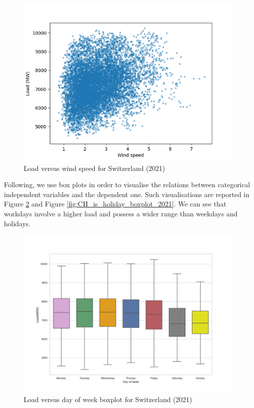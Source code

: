 \begin{figure}[!h]
    \includegraphics[width=\textwidth]{images/CH_load_vs_wind_speed_2021.png}
    \caption{Load versus wind speed for Switzerland (2021)}
    \label{fig:CH_load_vs_wind_speed_2021}
\end{figure}

Following, we use box plots in order to visualise the relations between categorical independent variables and the dependent one. Such visualisations are reported in Figure \ref{fig:CH_day_of_week_boxplot_2021} and Figure \ref{fig:CH_is_holiday_boxplot_2021}. We can see that workdays involve a higher load and possess a wider range than weekdays and holidays.

\begin{figure}[!h]
    \includegraphics[width=\textwidth]{images/CH_day_of_week_boxplot_2021.png}
    \caption{Load versus day of week boxplot for Switzerland (2021)}
    \label{fig:CH_day_of_week_boxplot_2021}
\end{figure}

